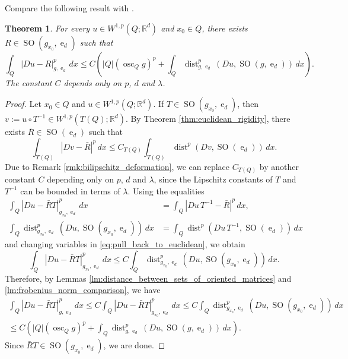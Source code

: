 \documentclass{article}
\numberwithin{equation}{section}
\newtheorem{theorem}{Theorem}[section]
\theoremstyle{definition}
\theoremstyle{remark}
\DeclareMathOperator{\dist}{dist}
\DeclareMathOperator{\e}{e}
\DeclareMathOperator*{\osc}{osc}
\DeclareMathOperator{\SO}{SO}
\begin{document}
Compare the following result with \cite[Theorem 2.3]{LP}.

\begin{theorem} \label{thm:noneuclidean_rigidity}
    For every $u \in W^{1, p}(Q; \mathbb{R}^d)$ and $x_0 \in Q$, there exists $R \in \SO(g_{x_0}, \e_d)$ such that
    \[
    \int_Q |Du - R|_{g, \e_d}^p \, dx \le C\left(|Q|\left(\osc_Q g\right)^p + \int_Q \dist_{g, \e_d}^p(Du, \SO(g, \e_d)) \, dx\right).
    \]
    The constant $C$ depends only on $p$, $d$ and $\lambda$.
\end{theorem}

\begin{proof}
    Let $x_0 \in Q$ and $u \in W^{1, p}(Q; \mathbb{R}^d)$. If $T \in \SO(g_{x_0}, \e_d)$, then $v := u \circ T^{-1} \in W^{1, p}(T(Q); \mathbb{R}^d)$. By Theorem \ref{thm:euclidean_rigidity}, there exists $\bar{R} \in \SO(\e_d)$ such that
    \begin{equation} \label{eq:pull_back_to_euclidean}
        \int_{T(Q)} |Dv - \bar{R}|^p \, dx \le C_{T(Q)} \int_{T(Q)} \dist^p(Dv, \SO(\e_d)) \, dx.
    \end{equation}
    Due to Remark \ref{rmk:bilipschitz_deformation}, we can replace $C_{T(Q)}$ by another constant $C$ depending only on $p$, $d$ and $\lambda$, since the Lipschitz constants of $T$ and $T^{-1}$ can be bounded in terms of $\lambda$. Using the equalities 
    \begin{align*}
    \int_Q |Du - \bar{R} T|_{g_{x_0}, \e_d}^p \, dx &= \int_Q |Du \, T^{-1} - \bar{R}|^p \, dx, \\
    \int_Q \dist_{g_{x_0}, \e_d}^p(Du, \SO(g_{x_0}, \e_d)) \, dx &= \int_Q \dist^p(Du \, T^{-1}, \SO(\e_d)) \, dx
    \end{align*}
    and changing variables in \eqref{eq:pull_back_to_euclidean}, we obtain
    \[
    \int_Q |Du - \bar{R} T|_{g_{x_0}, \e_d}^p \, dx \le C \int_Q \dist_{g_{x_0}, \e_d}^p(Du, \SO(g_{x_0}, \e_d)) \, dx.
    \]
    Therefore, by Lemmas \ref{lm:distance_between_sets_of_oriented_matrices} and \ref{lm:frobenius_norm_comparison}, we have
    \begin{multline*}
        \int_Q |Du - \bar{R} T|_{g, \e_d}^p \, dx \le C \int_Q |Du - \bar{R} T|_{g_{x_0}, \e_d}^p \, dx \le C \int_Q \dist_{g_{x_0}, \e_d}^p(Du, \SO(g_{x_0}, \e_d)) \, dx \\
        \le C \left(|Q|\left(\osc_Q g\right)^p + \int_Q \dist_{g, \e_d}^p(Du, \SO(g, \e_d)) \, dx\right).
    \end{multline*}
    Since $\bar{R}T \in \SO(g_{x_0}, \e_d)$, we are done.
\end{proof}
\end{document}
